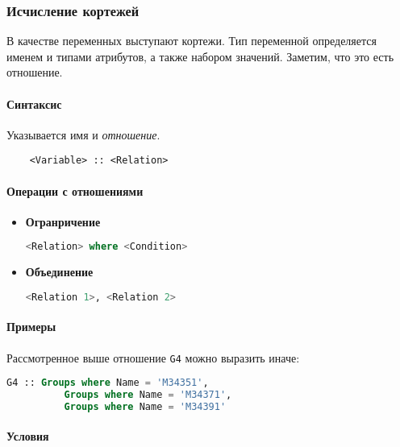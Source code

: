 \subsubsection{Исчисление кортежей}

В качестве переменных выступают кортежи. Тип переменной определяется именем и типами атрибутов, а
также набором значений. Заметим, что это есть отношение.

\paragraph{Синтаксис}

Указывается имя и \textit{отношение}.

\begin{lstlisting}
    <Variable> :: <Relation>
\end{lstlisting}

\paragraph{Операции с отношениями}

\begin{itemize}
	\item \textbf{Огранричение}
	      \begin{lstlisting}[language=SQL]
    <Relation> where <Condition>
        \end{lstlisting}
	\item \textbf{Объединение}
	      \begin{lstlisting}[language=SQL]
    <Relation 1>, <Relation 2>
        \end{lstlisting}
\end{itemize}

\paragraph{Примеры}

Рассмотренное выше отношение \texttt{G4} можно выразить иначе:

\begin{lstlisting}[language=SQL, mathescape=true]
    G4 :: Groups where Name = 'M34351',
          Groups where Name = 'M34371',
          Groups where Name = 'M34391'
\end{lstlisting}

\paragraph{Условия}

